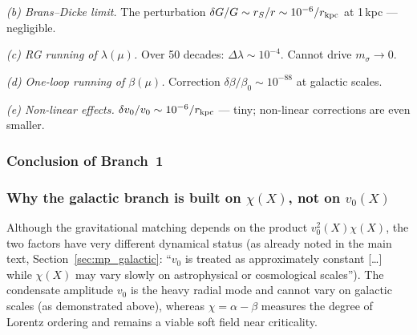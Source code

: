 \documentclass[11pt,a4paper]{article}
\numberwithin{equation}{section}
\begin{document}
\emph{(b) Brans--Dicke limit.} The perturbation
$\delta G/G \sim r_S/r \sim 10^{-6}/r_{\rm kpc}$ at
1\,kpc --- negligible.

\emph{(c) RG running of $\lambda(\mu)$.}
Over 50 decades: $\Delta\lambda \sim 10^{-4}$.
Cannot drive $m_\sigma \to 0$.

\emph{(d) One-loop running of $\beta(\mu)$.}
Correction $\delta\beta/\beta_0 \sim 10^{-88}$ at galactic
scales.

\emph{(e) Non-linear effects.}
$\delta v_0/v_0 \sim 10^{-6}/r_{\rm kpc}$ --- tiny;
non-linear corrections are even smaller.

\subsubsection{Conclusion of Branch~1}

\begin{center}
\end{center}

\subsubsection{Why the galactic branch is built on $\chi(X)$,
not on $v_0(X)$}

Although the gravitational matching depends on the product
$v_0^2(X)\chi(X)$, the two factors have very different
dynamical status
(as already noted in the main text,
Section~\ref{sec:mp_galactic}: ``$v_0$ is treated as
approximately constant [\ldots] while $\chi(X)$ may vary
slowly on astrophysical or cosmological scales'').
The condensate amplitude $v_0$ is the heavy radial mode
and cannot vary on galactic scales (as demonstrated above),
whereas $\chi = \alpha - \beta$ measures the degree of
Lorentz ordering and remains a viable soft field near
criticality.
\end{document}
